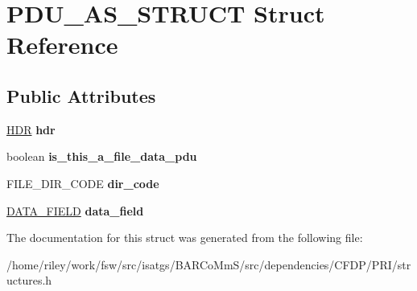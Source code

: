 \hypertarget{struct_p_d_u___a_s___s_t_r_u_c_t}{}\section{P\+D\+U\+\_\+\+A\+S\+\_\+\+S\+T\+R\+U\+CT Struct Reference}
\label{struct_p_d_u___a_s___s_t_r_u_c_t}
\subsection*{Public Attributes}
\begin{DoxyCompactItemize}
\item 
\hyperlink{struct_h_d_r}{H\+DR} {\bfseries hdr}\hypertarget{struct_p_d_u___a_s___s_t_r_u_c_t_a21f7c85339c5f28da0b572896c455188}{}\label{struct_p_d_u___a_s___s_t_r_u_c_t_a21f7c85339c5f28da0b572896c455188}

\item 
boolean {\bfseries is\+\_\+this\+\_\+a\+\_\+file\+\_\+data\+\_\+pdu}\hypertarget{struct_p_d_u___a_s___s_t_r_u_c_t_a0c1b743b813bc863e4f7052275cee968}{}\label{struct_p_d_u___a_s___s_t_r_u_c_t_a0c1b743b813bc863e4f7052275cee968}

\item 
F\+I\+L\+E\+\_\+\+D\+I\+R\+\_\+\+C\+O\+DE {\bfseries dir\+\_\+code}\hypertarget{struct_p_d_u___a_s___s_t_r_u_c_t_a8a7f600e62d176b8f3054e80327fc829}{}\label{struct_p_d_u___a_s___s_t_r_u_c_t_a8a7f600e62d176b8f3054e80327fc829}

\item 
\hyperlink{union_d_a_t_a___f_i_e_l_d}{D\+A\+T\+A\+\_\+\+F\+I\+E\+LD} {\bfseries data\+\_\+field}\hypertarget{struct_p_d_u___a_s___s_t_r_u_c_t_aaf9727776981c70e7e4d67ab30c70aec}{}\label{struct_p_d_u___a_s___s_t_r_u_c_t_aaf9727776981c70e7e4d67ab30c70aec}

\end{DoxyCompactItemize}


The documentation for this struct was generated from the following file\+:\begin{DoxyCompactItemize}
\item 
/home/riley/work/fsw/src/isatgs/\+B\+A\+R\+Co\+Mm\+S/src/dependencies/\+C\+F\+D\+P/\+P\+R\+I/structures.\+h\end{DoxyCompactItemize}

